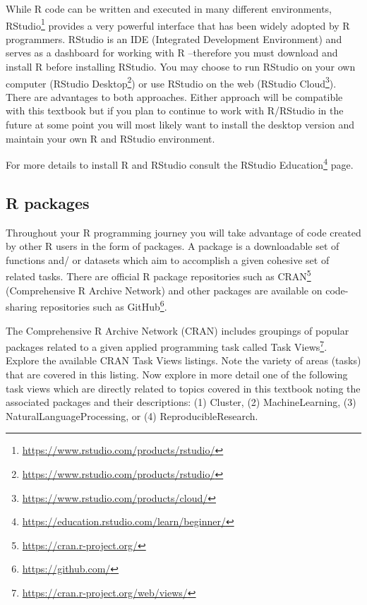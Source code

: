 \documentclass[
  letterpaper,
]{scrbook}
\DeclareRobustCommand{\href}[2]{#2\footnote{\url{#1}}}
\begin{document}
While R code can be written and executed in many different environments,
\href{https://www.rstudio.com/products/rstudio/}{RStudio} provides a
very powerful interface that has been widely adopted by R programmers.
RStudio is an IDE (Integrated Development Environment) and serves as a
dashboard for working with R --therefore you must download and install R
before installing RStudio. You may choose to run RStudio on your own
computer (\href{https://www.rstudio.com/products/rstudio/}{RStudio
Desktop}) or use RStudio on the web
(\href{https://www.rstudio.com/products/cloud/}{RStudio Cloud}). There
are advantages to both approaches. Either approach will be compatible
with this textbook but if you plan to continue to work with R/RStudio in
the future at some point you will most likely want to install the
desktop version and maintain your own R and RStudio environment.

For more details to install R and RStudio consult the
\href{https://education.rstudio.com/learn/beginner/}{RStudio Education}
page.

\hypertarget{r-packages}{%
\subsection*{R packages}\label{r-packages}}

Throughout your R programming journey you will take advantage of code
created by other R users in the form of packages. A package is a
downloadable set of functions and/ or datasets which aim to accomplish a
given cohesive set of related tasks. There are official R package
repositories such as \href{https://cran.r-project.org/}{CRAN}
(Comprehensive R Archive Network) and other packages are available on
code-sharing repositories such as \href{https://github.com/}{GitHub}.

\begin{tcolorbox}[enhanced jigsaw, title=\textcolor{quarto-callout-note-color}{\faInfo}\hspace{0.5em}{Consider}, titlerule=0mm, toptitle=1mm, colbacktitle=quarto-callout-note-color!10!white, bottomtitle=1mm, left=2mm, colframe=quarto-callout-note-color-frame, breakable, toprule=.15mm, colback=white, opacitybacktitle=0.6, leftrule=.75mm, rightrule=.15mm, bottomrule=.15mm, arc=.35mm, coltitle=black, opacityback=0]

The Comprehensive R Archive Network (CRAN) includes groupings of popular
packages related to a given applied programming task called
\href{https://cran.r-project.org/web/views/}{Task Views}. Explore the
available CRAN Task Views listings. Note the variety of areas (tasks)
that are covered in this listing. Now explore in more detail one of the
following task views which are directly related to topics covered in
this textbook noting the associated packages and their descriptions: (1)
Cluster, (2) MachineLearning, (3) NaturalLanguageProcessing, or (4)
ReproducibleResearch.

\end{tcolorbox}
\end{document}
